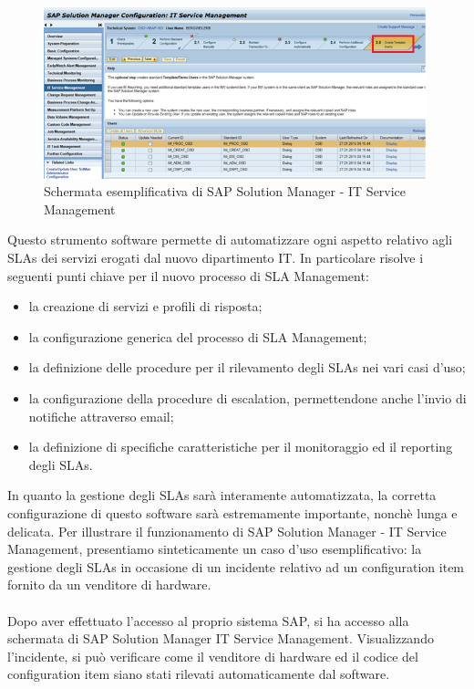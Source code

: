 \begin{figure}[H]
\centering
\includegraphics[width=30em]{immagini/sla/itservicemanagement.png}
\caption{Schermata esemplificativa di SAP Solution Manager - IT Service Management}
\end{figure}

Questo strumento software permette di automatizzare ogni aspetto relativo agli SLAs dei servizi erogati dal nuovo dipartimento IT. In particolare risolve i seguenti punti chiave per il nuovo processo di SLA Management:

\begin{itemize}
	\item la creazione di servizi e profili di risposta;
	\item la configurazione generica del processo di SLA Management;
	\item la definizione delle procedure per il rilevamento degli SLAs nei vari casi d'uso;
	\item la configurazione della procedure di escalation, permettendone anche l'invio di notifiche attraverso email;
	\item la definizione di specifiche caratteristiche per il monitoraggio ed il reporting degli SLAs.
\end{itemize}

In quanto la gestione degli SLAs sarà interamente automatizzata, la corretta configurazione di questo software sarà estremamente importante, nonchè lunga e delicata. Per illustrare il funzionamento di SAP Solution Manager - IT Service Management, presentiamo sinteticamente un caso d'uso esemplificativo: la gestione degli SLAs in occasione di un incidente relativo ad un configuration item fornito da un venditore di hardware.
\\ \\
Dopo aver effettuato l'accesso al proprio sistema SAP, si ha accesso alla schermata di SAP Solution Manager IT Service Management. Visualizzando l'incidente, si può verificare come il venditore di hardware ed il codice del configuration item siano stati rilevati automaticamente dal software.

